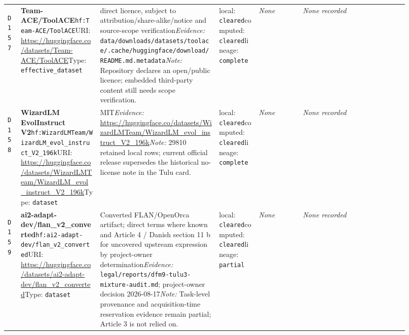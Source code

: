 \documentclass[9pt,a4paper]{article}
\newcommand{\depid}[1]{\hypertarget{dep:#1}{\texttt{#1}}}
\begin{document}
\begin{landscape}
\begin{longtable}{@{}L{0.035\linewidth}L{0.185\linewidth}L{0.27\linewidth}L{0.09\linewidth}L{0.10\linewidth}L{0.24\linewidth}@{}}
\depid{D157} & \textbf{Team-ACE/ToolACE}\newline \nolinkurl{hf:Team-ACE/ToolACE}\newline URI: \url{https://huggingface.co/datasets/Team-ACE/ToolACE}\newline Type: \texttt{effective\_dataset} & direct licence, subject to attribution/share-alike/notice and source-scope verification\newline \textit{Evidence:} \nolinkurl{data/downloads/datasets/toolace/.cache/huggingface/download/README.md.metadata}\newline \textit{Note:} Repository declares an open/public licence; embedded third-party content still needs scope verification. & local: \texttt{cleared}\newline computed: \texttt{cleared}\newline lineage: \texttt{complete} & \textit{None} & \textit{None recorded} \\
\depid{D158} & \textbf{WizardLM EvolInstruct V2}\newline \nolinkurl{hf:WizardLMTeam/WizardLM_evol_instruct_V2_196k}\newline URI: \url{https://huggingface.co/datasets/WizardLMTeam/WizardLM_evol_instruct_V2_196k}\newline Type: \texttt{dataset} & MIT\newline \textit{Evidence:} \url{https://huggingface.co/datasets/WizardLMTeam/WizardLM_evol_instruct_V2_196k}\newline \textit{Note:} 29810 retained local rows; current official release supersedes the historical no-license note in the Tulu card. & local: \texttt{cleared}\newline computed: \texttt{cleared}\newline lineage: \texttt{complete} & \textit{None} & \textit{None recorded} \\
\depid{D159} & \textbf{ai2-adapt-dev/flan\_v2\_converted}\newline \nolinkurl{hf:ai2-adapt-dev/flan_v2_converted}\newline URI: \url{https://huggingface.co/datasets/ai2-adapt-dev/flan_v2_converted}\newline Type: \texttt{dataset} & Converted FLAN/OpenOrca artifact; direct terms where known and Article 4 / Danish section 11 b for uncovered upstream expression by project-owner determination\newline \textit{Evidence:} \nolinkurl{legal/reports/dfm9-tulu3-mixture-audit.md}; project-owner decision 2026-08-17\newline \textit{Note:} Task-level provenance and acquisition-time reservation evidence remain partial; Article 3 is not relied on. & local: \texttt{cleared}\newline computed: \texttt{cleared}\newline lineage: \texttt{partial} & \textit{None} & \textit{None recorded} \\

\end{longtable}
\end{landscape}
\end{document}
